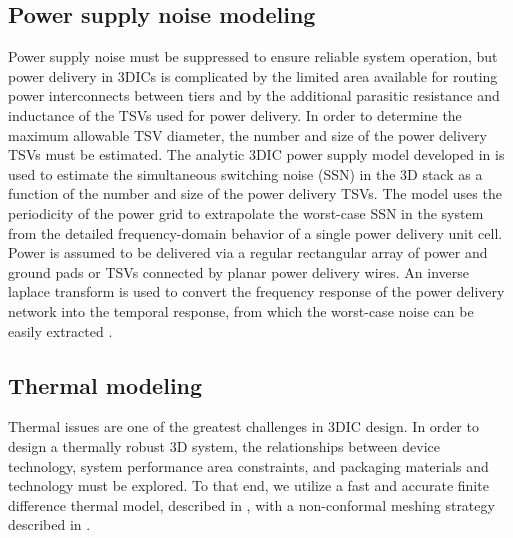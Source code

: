 \documentclass[journal,twoside]{IEEEtran}
\newcommand{\changed}[1]{\textcolor{red}{#1}}
\renewcommand{\changed}[1]{#1} %
\begin{document}
\subsection{Power supply noise modeling}
Power supply noise must be suppressed to ensure reliable system operation, but power delivery in 3DICs is 
complicated by the limited area available for routing power interconnects between tiers and by the additional
parasitic resistance and inductance of the TSVs used for power delivery. In order to determine the maximum allowable
TSV diameter, the number and size of the power delivery TSVs must be estimated.
%
\changed{The analytic 3DIC power supply model developed in \cite{zheng_novel_2014} is used to estimate the simultaneous switching noise (SSN)
in the 3D stack as a function of the number and size of the power delivery TSVs. The model uses the periodicity of the
power grid to extrapolate the worst-case SSN in the system from the detailed frequency-domain behavior of 
a single power delivery unit cell. Power is assumed to be delivered via a regular rectangular array of power and ground pads or TSVs
connected by planar power delivery wires. An inverse laplace transform is used to convert the frequency response of the power delivery network
into the temporal response, from which the worst-case noise can be easily extracted \cite{huang_power_2012}.}


\subsection{Thermal modeling}
Thermal issues are one of the greatest challenges in 3DIC design.
In order to design a thermally robust 3D system, the relationships between device technology, system performance
area constraints, and packaging materials and technology must be explored.
To that end, we utilize a fast and accurate finite difference thermal model, \changed{described in \cite{xie_electrical-thermal_2011},
with a non-conformal meshing strategy described in \cite{zhang-thermal-2014}.}
\end{document}
